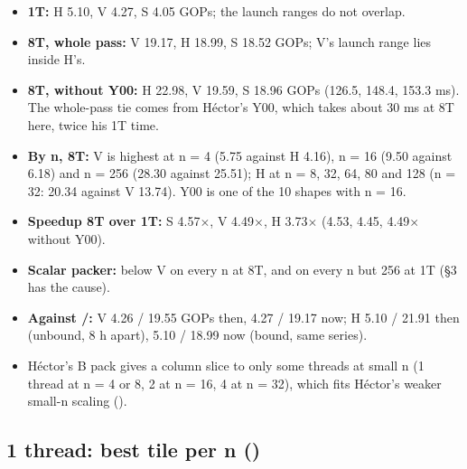 \begin{itemize}\setlength\itemsep{1pt}
\item \textbf{1T:} H 5.10, V 4.27, S 4.05 GOPs; the launch ranges do not overlap.
\item \textbf{8T, whole pass:} V 19.17, H 18.99, S 18.52 GOPs; V's launch range lies inside H's.
\item \textbf{8T, without Y00:} H 22.98, V 19.59, S 18.96 GOPs (126.5, 148.4, 153.3 ms). The whole-pass tie comes from H\'ector's Y00, which takes about 30 ms at 8T here, twice his 1T time.
\item \textbf{By n, 8T:} V is highest at n = 4 (5.75 against H 4.16), n = 16 (9.50 against 6.18) and n = 256 (28.30 against 25.51); H at n = 8, 32, 64, 80 and 128 (n = 32: 20.34 against V 13.74). Y00 is one of the 10 shapes with n = 16.
\item \textbf{Speedup 8T over 1T:} S 4.57$\times$, V 4.49$\times$, H 3.73$\times$ (4.53, 4.45, 4.49$\times$ without Y00).
\item \textbf{Scalar packer:} below V on every n at 8T, and on every n but 256 at 1T (\S3 has the cause).
\item \textbf{Against /:} V 4.26 / 19.55 GOPs then, 4.27 / 19.17 now; H 5.10 / 21.91 then (unbound, 8 h apart), 5.10 / 18.99 now (bound, same series).
\item H\'ector's B pack gives a column slice to only some threads at small n (1 thread at n = 4 or 8, 2 at n = 16, 4 at n = 32), which fits H\'ector's weaker small-n scaling ().
\end{itemize}

\subsection{1 thread: best tile per n ()}\label{sec:1t}
\begin{figure}[htbp]\centering
{}
\end{figure}

